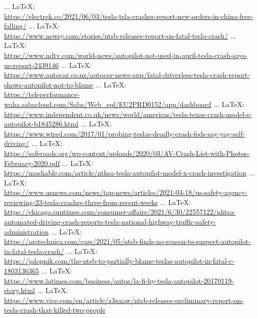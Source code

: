\begin{thebibliography}{99}
{ ... \LaTeX:\\ \url{https://electrek.co/2021/06/03/tesla-tsla-crashes-report-new-orders-in-china-free-falling/}
 ... \LaTeX:\\ \url{https://www.newsy.com/stories/ntsb-releases-report-on-fatal-tesla-crash/}
 ... \LaTeX:\\ \url{https://www.ndtv.com/world-news/autopilot-not-used-in-april-tesla-crash-says-us-report-2439146}
 ... \LaTeX:\\ \url{https://www.autocar.co.nz/autocar-news-app/fatal-driverless-tesla-crash-report-shows-autopilot-not-to-blame}
 ... \LaTeX:\\ \url{https://teleperformance-waha.sabacloud.com/Saba/Web_spf/EU2PRD0152/app/dashboard}
 ... \LaTeX:\\ \url{https://www.independent.co.uk/news/world/americas/tesla-texas-crash-model-s-autopilot-b1845286.html}
 ... \LaTeX:\\ \url{https://www.wired.com/2017/01/probing-teslas-deadly-crash-feds-say-yay-self-driving/}
 ... \LaTeX:\\ \url{https://saferoads.org/wp-content/uploads/2020/03/AV-Crash-List-with-Photos-February-2020.pdf}
 ... \LaTeX:\\ \url{https://mashable.com/article/nthsa-tesla-autopilot-model-x-crash-investigation}
 ... \LaTeX:\\ \url{https://www.usnews.com/news/top-news/articles/2021-03-18/us-safety-agency-reviewing-23-tesla-crashes-three-from-recent-weeks}
 ... \LaTeX:\\ \url{https://chicago.suntimes.com/consumer-affairs/2021/6/30/22557122/nhtsa-automated-driving-crash-reports-tesla-national-highway-traffic-safety-administration}
 ... \LaTeX:\\ \url{https://arstechnica.com/cars/2021/05/ntsb-finds-no-reason-to-suspect-autopilot-in-fatal-tesla-crash/}
 ... \LaTeX:\\ \url{https://jalopnik.com/the-ntsb-to-partially-blame-teslas-autopilot-in-fatal-c-1803136365}
 ... \LaTeX:\\ \url{https://www.latimes.com/business/autos/la-fi-hy-tesla-autopilot-20170119-story.html}
 ... \LaTeX:\\ \url{https://www.vice.com/en/article/z3xxaw/ntsb-releases-preliminary-report-on-tesla-crash-that-killed-two-people}
}
\end{thebibliography}
